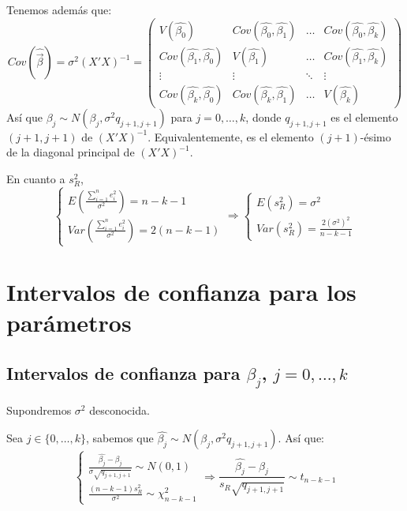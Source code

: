 \documentclass{report}
\theoremstyle{remark}
\theoremstyle{remark}
\theoremstyle{remark}
\theoremstyle{definition}
\theoremstyle{definition}
\theoremstyle{definition}
\begin{document}
Tenemos además que:
$$Cov(\hat{\vec{\beta}}) = \sigma^2(X'X)^{-1} = \begin{pmatrix}
        V(\hat{\beta_0})                  & Cov(\hat{\beta_0}, \hat{\beta_1}) & \dots  & Cov(\hat{\beta_0}, \hat{\beta_k}) \\
        Cov(\hat{\beta_1}, \hat{\beta_0}) & V(\hat{\beta_1})                  & \dots  & Cov(\hat{\beta_1}, \hat{\beta_k}) \\
        \vdots                            & \vdots                            & \ddots & \vdots                            \\
        Cov(\hat{\beta_k}, \hat{\beta_0}) & Cov(\hat{\beta_k}, \hat{\beta_1}) & \dots  & V(\hat{\beta_k})
    \end{pmatrix}$$
Así que $\hat{\beta_j} \sim N(\beta_j, \sigma^2 q_{j+1, j+1})$ para $j = 0, \dots, k$, donde $q_{j+1, j+1}$ es el elemento $(j+1, j+1)$ de $(X'X)^{-1}$.
Equivalentemente, es el elemento $(j+1)$-ésimo de la diagonal principal de $(X'X)^{-1}$.

En cuanto a $s_R^2$,
$$\begin{cases}
        E(\frac{\sum_{i=1}^n e_i^2}{\sigma^2}) = n-k-1 \\
        Var(\frac{\sum_{i=1}^n e_i^2}{\sigma^2}) = 2(n-k-1)
    \end{cases} \Rightarrow \begin{cases}
        E(s_R^2) = \sigma^2 \\
        Var(s_R^2) = \frac{2(\sigma^2)^2}{n-k-1}
    \end{cases}$$

\section{Intervalos de confianza para los parámetros}
\subsection*{Intervalos de confianza para $\beta_j$, $j = 0, \dots, k$}
Supondremos $\sigma^2$ desconocida.

Sea $j \in \{0, \dots, k\}$, sabemos que $\hat{\beta_j} \sim N(\beta_j, \sigma^2 q_{j+1, j+1})$.
Así que:
$$\begin{cases}
        \frac{\hat{\beta_j} - \beta_j}{\sigma \sqrt{q_{j+1, j+1}}} \sim N(0, 1) \\
        \frac{(n-k-1)s_R^2}{\sigma^2} \sim \chi^2_{n-k-1}
    \end{cases} \Rightarrow \frac{\hat{\beta_j} - \beta_j}{s_R \sqrt{q_{j+1, j+1}}} \sim t_{n-k-1}$$
\end{document}
